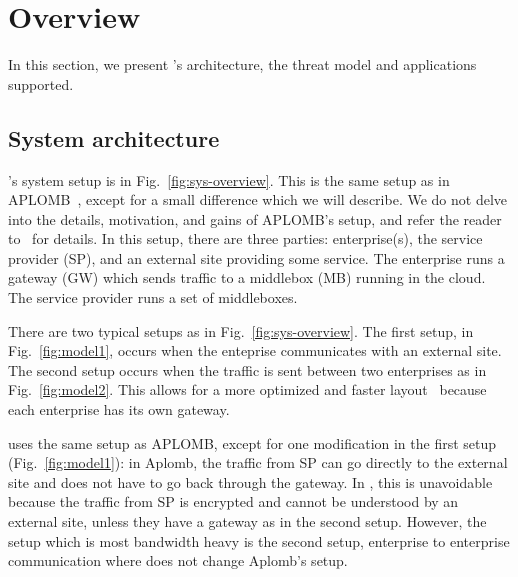 


     
\section{Overview}\label{sec:overview}








In this section, we present \sys's architecture, the threat model and applications supported.


\subsection{System architecture}

\sys's system setup is in Fig.~\ref{fig:sys-overview}. This is the same setup as in APLOMB~\cite{aplomb}, 
except for a small difference which we will describe. 
We do not delve into the details, motivation, and gains of APLOMB's setup, and refer the reader to~\cite{aplomb} for details. 
In this setup, there are three parties: enterprise(s), the service provider (SP), and an external site providing
some service. The enterprise runs a gateway (GW) which sends traffic to a middlebox (MB) running in the cloud.
The service provider runs a set of middleboxes. 

There are two typical setups as in Fig.~\ref{fig:sys-overview}.  The first setup, in Fig.~\ref{fig:model1},  occurs when the enteprise communicates with an external site. The second setup occurs when the traffic is sent between two enterprises as in Fig.~\ref{fig:model2}. This allows for a more optimized and faster layout~\cite{aplomb} because  each enterprise has its own gateway.

\sys uses the same setup as APLOMB, except for one modification in the first setup (Fig.~\ref{fig:model1}): in Aplomb, the traffic from SP can go directly to the external site and does not have to go back through the gateway. In \sys, this is unavoidable because the traffic from SP is encrypted and cannot be understood by an external site, unless they have a gateway as in the second setup. However, the setup which is most bandwidth heavy is the second setup, enterprise to enterprise communication where \sys does not change Aplomb's setup.



